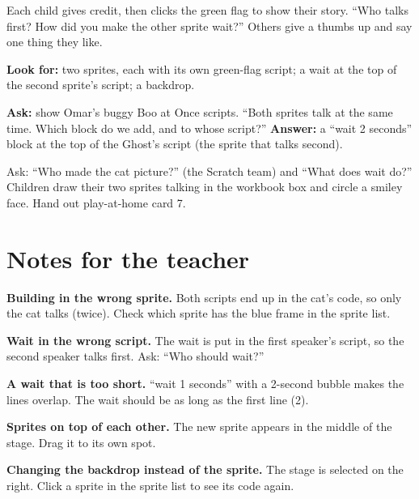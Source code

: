 \begin{teacherscript}
Each child gives credit, then clicks the green flag to show their story. \enquote{Who talks first? How did you make the other sprite wait?} Others give a thumbs up and say one thing they like.
\end{teacherscript}

\begin{formativecheck}
\textbf{Look for:} two sprites, each with its own green-flag script; a wait at the top of the second sprite's script; a backdrop.

\textbf{Ask:} show Omar's buggy Boo at Once scripts. \enquote{Both sprites talk at the same time. Which block do we add, and to whose script?}
\textbf{Answer:} a \enquote{wait 2 seconds} block at the top of the Ghost's script (the sprite that talks second).
\end{formativecheck}

\begin{reflection}
Ask: \enquote{Who made the cat picture?} (the Scratch team) and \enquote{What does wait do?} Children draw their two sprites talking in the workbook box and circle a smiley face. Hand out play-at-home card 7.
\end{reflection}

\section{Notes for the teacher}
\begin{commonmistakes}
  \item \textbf{Building in the wrong sprite.} Both scripts end up in the cat's code, so only the cat talks (twice). Check which sprite has the blue frame in the sprite list.
  \item \textbf{Wait in the wrong script.} The wait is put in the first speaker's script, so the second speaker talks first. Ask: \enquote{Who should wait?}
  \item \textbf{A wait that is too short.} \enquote{wait 1 seconds} with a 2-second bubble makes the lines overlap. The wait should be as long as the first line (2).
  \item \textbf{Sprites on top of each other.} The new sprite appears in the middle of the stage. Drag it to its own spot.
  \item \textbf{Changing the backdrop instead of the sprite.} The stage is selected on the right. Click a sprite in the sprite list to see its code again.
\end{commonmistakes}

